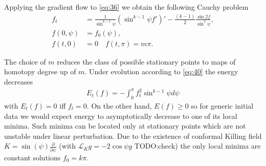Applying the gradient flow to \eqref{eq:36} we obtain the following
Cauchy problem
\begin{equation}
  \label{eq:en_flow}
  \begin{split}
    f_t&=\frac{1}{\sin^{k-1}\psi}\left(\sin^{k-1}\psi
      f'\right)'-\frac{(k-1)}{2}\frac{\sin2f}{\sin^2\psi},\\
    f(0,\psi)&=f_0(\psi),\\
    f(t,0)&=0\quad f(t,\pi)=m\pi.
  \end{split}
\end{equation}


The choice of $m$ reduces the class of possible stationary points
to maps of homotopy degree up of $m$. Under evolution according to
\eqref{eq:40} the energy decreases
\begin{align}
  \label{eq:37}
  E_t(f)=-\int_0^{\pi}f_t^2\sin^{k-1}\psi d\psi
\end{align}
with $E_t(f)=0$ iff $f_t=0$. On the other hand, $E(f)\ge0$ so for
generic initial data we would expect energy to asymptotically decrease
to one of its local minima. Such minima can be located only at
stationary points which are not unstable under linear
perturbation. Due to the existence of conformal Killing field
$K=\sin(\psi)\frac{\partial}{\partial \psi}$ (with $\mathcal{L}_K
g=-2\cos\psi g$ TODO:check) the only local minima are constant
solutions $f_0=k\pi$.


